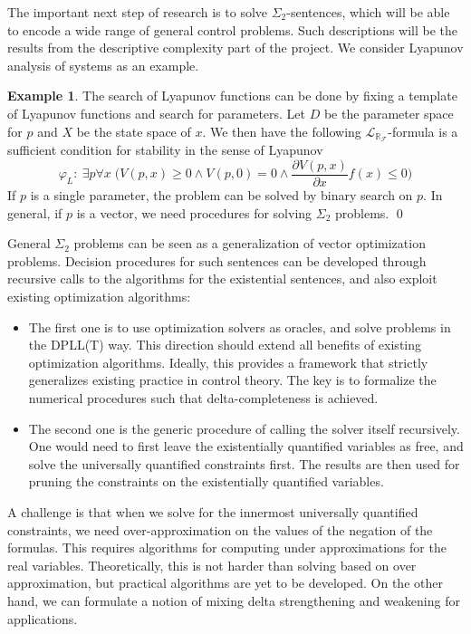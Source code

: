 \documentclass[11pt]{article}
\newcommand{\lrf}{\mathcal{L}_{\mathbb{R}_{\mathcal{F}}}}
\theoremstyle{definition}
\newtheorem{example}{Example}[section]
\begin{document}
The important next step of research is to solve $\Sigma_2$-sentences, which will be able to encode a wide range of general control problems. Such descriptions will be the results from the descriptive complexity part of the project. We consider Lyapunov analysis of systems as an example. 
\begin{example}
The search of Lyapunov functions can be done by fixing a template of Lyapunov functions and search for parameters. 
Let $D$ be the parameter space for $p$ and $X$ be the state space of $x$. We then have the following $\lrf$-formula is a sufficient condition for stability in the sense of Lyapunov
$$\varphi_L:\ \exists p\forall x\; \bigg(V(p,x)\geq 0 \wedge V(p,0) = 0\wedge \frac{\partial V(p,x)}{\partial x}f(x)\leq 0\bigg)$$
If $p$ is a single parameter, the problem can be solved by binary search on $p$. In general, if $p$ is a vector, we need procedures for solving $\Sigma_2$ problems. \qed
\end{example}
General $\Sigma_2$ problems can be seen as a generalization of vector optimization problems.  Decision procedures for such sentences can be developed through recursive calls to the algorithms for the existential sentences, and also exploit existing optimization algorithms:
\begin{itemize}
\item The first one is to use optimization solvers as oracles, and solve problems in the DPLL(T) way. This direction should extend all benefits of existing optimization algorithms. Ideally, this provides a framework that strictly generalizes existing practice in control theory. The key is to formalize the numerical procedures such that delta-completeness is achieved. 
\item The second one is the generic procedure of calling the solver itself recursively. One would need to first leave the existentially quantified variables as free, and solve the universally quantified constraints first. The results are then used for pruning the constraints on the existentially quantified variables. 
\end{itemize}
A challenge is that when we solve for the innermost universally quantified constraints, we need over-approximation on the values of the negation of the formulas. This requires algorithms for computing under approximations for the real variables. Theoretically, this is not harder than solving based on over approximation, but practical algorithms are yet to be developed. On the other hand, we can formulate a notion of mixing delta strengthening and weakening for applications.
\end{document}
